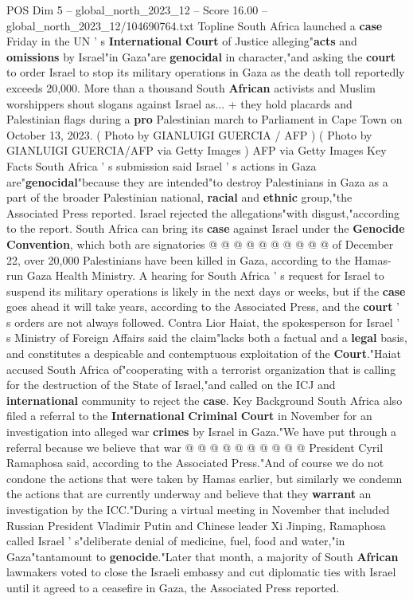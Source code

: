\begin{textsample}{POS Dim 5 – global\_north\_2023\_12 – Score 16.00 – global\_north\_2023\_12/104690764.txt}  \label{ex:f5_pos_396}
Topline South Africa launched a \textbf{case} Friday in the UN ' s \textbf{International} \textbf{Court} of Justice alleging"\textbf{acts} and \textbf{omissions} by Israel"in Gaza"are \textbf{genocidal} in character,"and asking the \textbf{court} to order Israel to stop its military operations in Gaza as the death toll reportedly exceeds 20,000.
More than a thousand South \textbf{African} activists and Muslim worshippers shout slogans against Israel as... + they hold placards and Palestinian flags during a \textbf{pro} Palestinian march to Parliament in Cape Town on October 13, 2023. ( Photo by GIANLUIGI GUERCIA / AFP ) ( Photo by GIANLUIGI GUERCIA/AFP via Getty Images ) AFP via Getty Images Key Facts South Africa ' s submission said Israel ' s actions in Gaza are"\textbf{genocidal}"because they are intended"to destroy Palestinians in Gaza as a part of the broader Palestinian national, \textbf{racial} and \textbf{ethnic} group,"the Associated Press reported.
Israel rejected the allegations"with disgust,"according to the report.
South Africa can bring its \textbf{case} against Israel under the \textbf{Genocide} \textbf{Convention}, which both are signatories @ @ @ @ @ @ @ @ @ @ of December 22, over 20,000 Palestinians have been killed in Gaza, according to the Hamas-run Gaza Health Ministry.
A hearing for South Africa ' s request for Israel to suspend its military operations is likely in the next days or weeks, but if the \textbf{case} goes ahead it will take years, according to the Associated Press, and the \textbf{court} ' s orders are not always followed.
Contra Lior Haiat, the spokesperson for Israel ' s Ministry of Foreign Affairs said the claim"lacks both a factual and a \textbf{legal} basis, and constitutes a despicable and contemptuous exploitation of the \textbf{Court}."Haiat accused South Africa of"cooperating with a terrorist organization that is calling for the destruction of the State of Israel,"and called on the ICJ and \textbf{international} community to reject the \textbf{case}.
Key Background South Africa also filed a referral to the \textbf{International} \textbf{Criminal} \textbf{Court} in November for an investigation into alleged war \textbf{crimes} by Israel in Gaza."We have put through a referral because we believe that war @ @ @ @ @ @ @ @ @ @ President Cyril Ramaphosa said, according to the Associated Press."And of course we do not condone the actions that were taken by Hamas earlier, but similarly we condemn the actions that are currently underway and believe that they \textbf{warrant} an investigation by the ICC."During a virtual meeting in November that included Russian President Vladimir Putin and Chinese leader Xi Jinping, Ramaphosa called Israel ' s"deliberate denial of medicine, fuel, food and water,"in Gaza"tantamount to \textbf{genocide}."Later that month, a majority of South \textbf{African} lawmakers voted to close the Israeli embassy and cut diplomatic ties with Israel until it agreed to a ceasefire in Gaza, the Associated Press reported.

\end{textsample}
